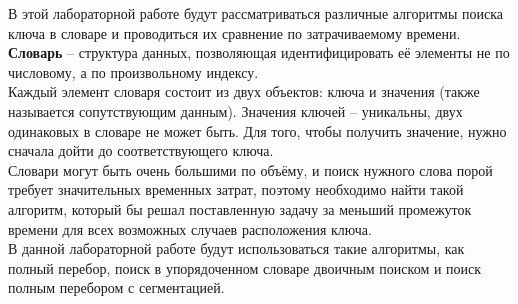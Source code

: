 В этой лабораторной работе будут рассматриваться различные алгоритмы поиска ключа в словаре и проводиться их сравнение по затрачиваемому времени. \\

\textbf{Словарь} -- структура данных, позволяющая идентифицировать её элементы не по числовому, а по произвольному индексу. \\

Каждый элемент словаря состоит из двух объектов: ключа и значения (также называется сопутствующим данным). Значения ключей -- уникальны, двух одинаковых в словаре не может быть. Для того, чтобы получить значение, нужно сначала дойти до соответствующего ключа.\\

Словари могут быть очень большими по объёму, и поиск нужного слова порой требует значительных временных затрат, поэтому необходимо найти такой алгоритм, который бы решал поставленную задачу за меньший промежуток времени для всех возможных случаев расположения ключа.\\

В данной лабораторной работе будут использоваться такие алгоритмы, как полный перебор, поиск в упорядоченном словаре двоичным поиском и поиск полным перебором с сегментацией.

